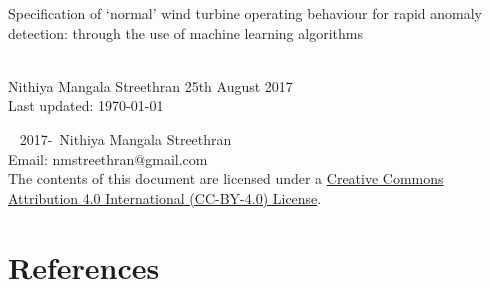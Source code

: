 \documentclass[twoside,12pt,openany]{book}
\def\theauthor{Nithiya Mangala Streethran}
\def\thetitle{%
  Specification of \texorpdfstring{`}{'}normal' wind turbine operating
  behaviour for rapid anomaly detection: through the use of machine
  learning algorithms%
}
\begin{document}
\thefrontmatter

\begin{titlepage}
  \hspace{0pt}\vfill %
  \centering %
  \Large\thetitle
  \\[4cm]
  \large\theauthor
  \vfill
  25th August 2017
  \\[2cm]
  Last updated: \today
  \vfill\hspace{0pt} %
\end{titlepage}

\onehalfspacing

\hspace{0pt}\vfill
\noindent\textcopyright~ 2017-\the\year{}~\theauthor \\[.5cm]
\noindent Email: nmstreethran@gmail.com \\[.5cm]
\noindent The contents of this document are licensed under a
\href{https://creativecommons.org/licenses/by/4.0/}%
{Creative Commons Attribution 4.0 International (CC-BY-4.0) License}.
\vfill\hspace{0pt}



\contentlists

\themainmatter







{%
  \backmatter%
  \chapter{References}%
  \printbibliography[category=cited,heading=none]%
}

\theappendix


\end{document}
